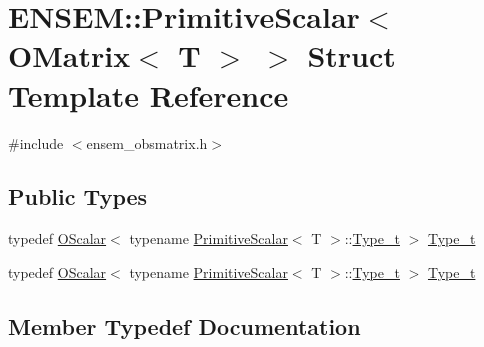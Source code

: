\hypertarget{structENSEM_1_1PrimitiveScalar_3_01OMatrix_3_01T_01_4_01_4}{}\section{E\+N\+S\+EM\+:\+:Primitive\+Scalar$<$ O\+Matrix$<$ T $>$ $>$ Struct Template Reference}
\label{structENSEM_1_1PrimitiveScalar_3_01OMatrix_3_01T_01_4_01_4}


{\ttfamily \#include $<$ensem\+\_\+obsmatrix.\+h$>$}

\subsection*{Public Types}
\begin{DoxyCompactItemize}
\item 
typedef \mbox{\hyperlink{classENSEM_1_1OScalar}{O\+Scalar}}$<$ typename \mbox{\hyperlink{structENSEM_1_1PrimitiveScalar}{Primitive\+Scalar}}$<$ T $>$\+::\mbox{\hyperlink{structENSEM_1_1PrimitiveScalar_3_01OMatrix_3_01T_01_4_01_4_a4e7f325878a1ec4acea1a745cbd24af6}{Type\+\_\+t}} $>$ \mbox{\hyperlink{structENSEM_1_1PrimitiveScalar_3_01OMatrix_3_01T_01_4_01_4_a4e7f325878a1ec4acea1a745cbd24af6}{Type\+\_\+t}}
\item 
typedef \mbox{\hyperlink{classENSEM_1_1OScalar}{O\+Scalar}}$<$ typename \mbox{\hyperlink{structENSEM_1_1PrimitiveScalar}{Primitive\+Scalar}}$<$ T $>$\+::\mbox{\hyperlink{structENSEM_1_1PrimitiveScalar_3_01OMatrix_3_01T_01_4_01_4_a4e7f325878a1ec4acea1a745cbd24af6}{Type\+\_\+t}} $>$ \mbox{\hyperlink{structENSEM_1_1PrimitiveScalar_3_01OMatrix_3_01T_01_4_01_4_a4e7f325878a1ec4acea1a745cbd24af6}{Type\+\_\+t}}
\end{DoxyCompactItemize}


\subsection{Member Typedef Documentation}
\mbox{\label{structENSEM_1_1PrimitiveScalar_3_01OMatrix_3_01T_01_4_01_4_a4e7f325878a1ec4acea1a745cbd24af6}} 
